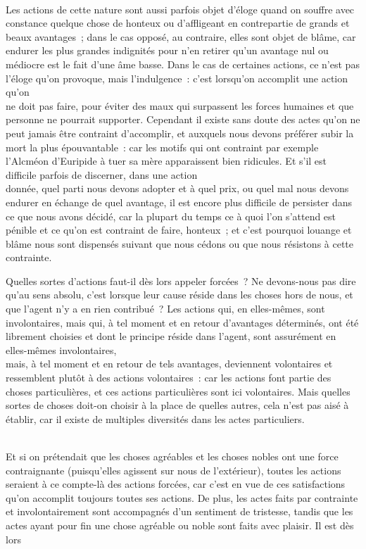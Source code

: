 \documentclass[french,twoside]{book} %
\begin{document}
\\
Les actions de cette nature sont aussi parfois objet d’éloge quand on souffre avec constance quelque chose de honteux ou d’affligeant en contrepartie de grands et beaux avantages ; dans le cas opposé, au contraire, elles sont objet de blâme, car endurer les plus grandes indignités pour n’en retirer qu’un avantage nul ou médiocre est le fait d’une âme basse. Dans le cas de certaines actions, ce n’est pas l’éloge qu’on provoque, mais l’indulgence : c’est lorsqu’on accomplit une action qu’on \\
ne doit pas faire, pour éviter des maux qui surpassent les forces humaines et que personne ne pourrait supporter. Cependant il existe sans doute des actes qu’on ne peut jamais être contraint d’accomplir, et auxquels nous devons préférer subir la mort la plus épouvantable : car les motifs qui ont contraint par exemple l’Alcméon d’Euripide à tuer sa mère apparaissent bien ridicules. Et s’il est difficile parfois de discerner, dans une action \\
donnée, quel parti nous devons adopter et à quel prix, ou quel mal nous devons endurer en échange de quel avantage, il est encore plus difficile de persister dans ce que nous avons décidé, car la plupart du temps ce à quoi l’on s’attend est pénible et ce qu’on est contraint de faire, honteux ; et c’est pourquoi louange et blâme nous sont dispensés suivant que nous cédons ou que nous résistons à cette contrainte.\par
 Quelles sortes d’actions faut-il dès lors appeler forcées ? Ne devons-nous pas dire qu’au sens absolu, c’est lorsque leur cause réside dans les choses hors de nous, et que l’agent n’y a en rien contribué ? Les actions qui, en elles-mêmes, sont involontaires, mais qui, à tel moment et en retour d’avantages déterminés, ont été librement choisies et dont le principe réside dans l’agent, sont assurément en elles-mêmes involontaires, \\
mais, à tel moment et en retour de tels avantages, deviennent volontaires et ressemblent plutôt à des actions volontaires : car les actions font partie des choses particulières, et ces actions particulières sont ici volontaires. Mais quelles sortes de choses doit-on choisir à la place de quelles autres, cela n’est pas aisé à établir, car il existe de multiples diversités dans les actes particuliers.\par
\\
Et si on prétendait que les choses agréables et les choses nobles ont une force contraignante (puisqu’elles agissent sur nous de l’extérieur), toutes les actions seraient à ce compte-là des actions forcées, car c’est en vue de ces satisfactions qu’on accomplit toujours toutes ses actions. De plus, les actes faits par contrainte et involontairement sont accompagnés d’un sentiment de tristesse, tandis que les actes ayant pour fin une chose agréable ou noble sont faits avec plaisir. Il est dès lors \\
\end{document}
